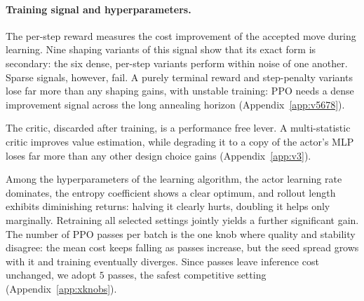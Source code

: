 \documentclass[letterpaper]{article} %
\begin{document}



\paragraph{Training signal and hyperparameters.}
The per-step reward measures the cost improvement of the accepted move
during learning. Nine shaping variants of this signal show that its exact
form is secondary: the six dense, per-step variants perform within noise
of one another. Sparse signals, however, fail. A purely terminal reward
and step-penalty variants lose far more than any shaping gains, with
unstable training: PPO needs a dense improvement signal across the long
annealing horizon (Appendix~\ref{app:v5678}). 

The critic, discarded after training, is a performance free lever. A multi-statistic critic improves
value estimation, while degrading it to a copy of the actor's MLP loses
far more than any other design choice gains (Appendix~\ref{app:v3}).

Among the hyperparameters of the learning algorithm, the actor learning
rate dominates, the entropy coefficient shows a clear optimum, and
rollout length exhibits diminishing returns: halving it clearly hurts,
doubling it helps only marginally. Retraining all selected settings
jointly yields a further significant gain. The number of PPO passes per
batch is the one knob where quality and stability disagree: the mean
cost keeps falling as passes increase, but the seed spread grows with it
and training eventually diverges. Since passes leave inference cost
unchanged, we adopt $5$ passes, the safest competitive setting
(Appendix~\ref{app:xknobs}).
\end{document}
